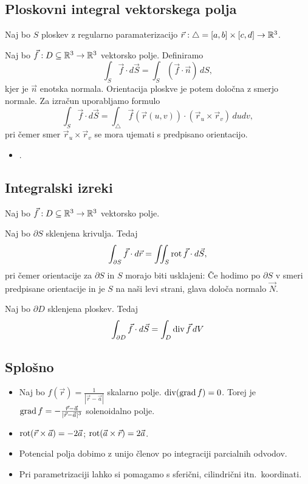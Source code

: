 \subsection{Ploskovni integral vektorskega polja}
Naj bo \(S\) ploskev z regularno paramaterizacijo \(\vec{r}: \triangle = [a, b] \times [c,d] \to \mathbb{R}^3\).

Naj bo \(\vec{f}: D \subseteq \mathbb{R}^3 \to \mathbb{R}^3\) vektorsko polje. Definiramo
\[
    \int_{S} \vec{f} \cdot d \vec{S} = \int_{S} (\vec{f} \cdot \vec{n})\, dS,
\]
kjer je \(\vec{n}\) enotska normala. Orientacija ploskve je potem določna z smerjo normale. Za izračun uporabljamo formulo
\[
    \int_{S} \vec{f} \cdot d \vec{S} = \int_{\triangle} \vec{f}(\vec{r}(u, v)) \cdot (\vec{r}_u \times \vec{r}_v) \, dudv,
\]
pri čemer smer \(\vec{r}_u \times \vec{r}_v\) se mora ujemati s predpisano orientacijo.
\begin{itemize}
    \item {}.
\end{itemize}

\subsection{Integralski izreki}
Naj bo \(\vec{f}: D \subseteq \mathbb{R}^3 \to \mathbb{R}^3\) vektorsko polje.
\begin{izrek}
    Naj bo \(\partial S\) sklenjena krivulja. Tedaj
    \[
        \int_{\partial S} \vec{f} \cdot d\vec{r} = \iint_{S} \operatorname{rot} \vec{f} \cdot d \vec{S},
    \]
    pri čemer orientacije za \(\partial S\) in \(S\) morajo biti usklajeni: Če hodimo po \(\partial S\) v smeri predpisane orientacije in je \(S\) na naši levi strani, glava določa normalo \(\vec{N}\).
\end{izrek}

\begin{izrek}
    Naj bo \(\partial D\) sklenjena ploskev. Tedaj
    \[
        \int_{\partial D} \vec{f} \cdot d\vec{S} = \int_{D} \operatorname{div} \vec{f} \, dV
    \]
\end{izrek}

\subsection{Splošno}
\begin{itemize}
    \item Naj bo \(f(\vec{r}) = \frac{1}{|\vec{r} - \vec{a}|}\) skalarno polje. \(\operatorname{div} (\operatorname{grad} f) = 0\). Torej je \(\operatorname{grad} f = - \frac{\vec{r} - \vec{a}}{|\vec{r} - \vec{a}|^3}\) solenoidalno polje.
    \item \(\operatorname{rot} (\vec{r} \times \vec{a}) = - 2 \vec{a}\); \(\operatorname{rot} (\vec{a} \times \vec{r}) = 2 \vec{a}\).
    \item Potencial polja dobimo z unijo členov po integraciji parcialnih odvodov.
    \item Pri parametrizaciji lahko si pomagamo s sferični, cilindrični itn.\ koordinati.
\end{itemize}

